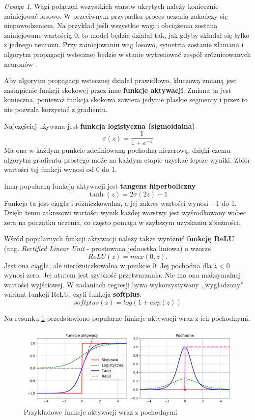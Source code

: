 \documentclass[12pt]{mwbk}
\theoremstyle{plain}
\theoremstyle{definition}
\theoremstyle{remark}
\newtheorem{uwaga}{Uwaga}[chapter]
\newcommand\zrodlo[1]{\par\vspace{-3mm}{\small\textit{Źródło: }#1 }}
\begin{document}
\begin{uwaga}
	Wagi połączeń wszystkich warstw ukrytych należy koniecznie zainicjować losowo. W przeciwnym przypadku proces uczenia zakończy się niepowodzeniem. Na przykład jeśli wszystkie wagi i obciążenia zostaną zainicjowane wartością 0, to model będzie działał tak, jak gdyby składał się tylko z jednego neuronu. Przy zainicjowaniu wag losowo, symetria zostanie złamana i algorytm propagacji wstecznej będzie w stanie wytrenować zespół zróżnicowanych neuronów \cite{geron}. 
\end{uwaga}

Aby algorytm propagacji wstecznej działał prawidłowo, kluczową zmianą jest zastąpienie funkcji skokowej przez inne \textbf{funkcje aktywacji}. Zmiana ta jest konieczna, ponieważ funkcja skokowa zawiera jedynie płaskie segmenty i przez to nie pozwala korzystać z gradientu. 

Najczęściej używana jest \textbf{funkcja logistyczna (sigmoidalna)}
$$\sigma(z)=\frac{1}{1+e^{-z}}$$
Ma ona w każdym punkcie zdefiniowaną pochodną niezerową, dzięki czemu algorytm gradientu prostego może na każdym etapie uzyskać lepsze wyniki. Zbiór wartości tej funkcji wynosi od 0 do 1.

Inną popularną funkcją aktywacji jest \textbf{tangens hiperboliczny}
$$\operatorname{tanh}(z)=2\sigma(2z)-1$$
Funkcja ta jest ciągła i różniczkowalna, a jej zakres wartości wynosi $-1$ do 1. Dzięki temu zakresowi wartości wynik każdej warstwy jest wyśrodkowany wobec zera na początku uczenia, co często pomaga w szybszym uzyskaniu zbieżności.

Wśród popularnych funkcji aktywacji należy także wyróżnić  \textbf{funkcję ReLU} (ang. \emph{Rectified Linear Unit} - prostowana jednostka liniowa) o wzorze
$$ReLU(z)=max(0,z).$$
Jest ona ciągła, ale nieróżniczkowalna w punkcie 0. Jej pochodna dla $z<0$ wynosi zero. Jej atutem jest szybkość przetwarzania. Nie ma ona maksymalnej wartości wyjściowej.
W zadaniach regresji bywa wykorzystywany ,,wygładzony'' wariant funkcji ReLU, czyli funkcja \textbf{softplus}:
$$softplus(z)=log(1+exp(z))$$

Na  rysunku \ref{fig:funkcje-aktywacji} przedstawiono popularne funkcje aktywacji wraz z ich pochodnymi.

\begin{figure}[!h]
	\centering
	\includegraphics[width=\linewidth]{rys/funkcje_aktywacji.png}
	\caption{Przykładowe funkcje aktywacji wraz z pochodnymi}
	\zrodlo{\cite{geron}}
	\label{fig:funkcje-aktywacji}
\end{figure}
\end{document}
